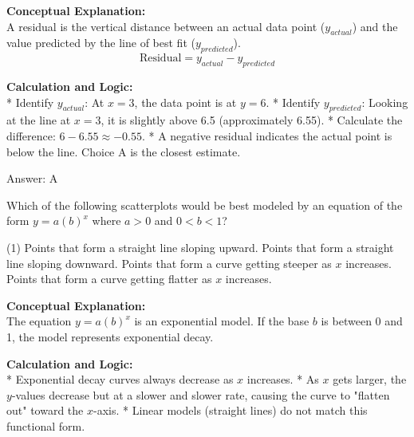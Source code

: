 \documentclass[11pt,paper=a4,answers]{exam}
\begin{document}
\begin{questions}
\begin{solution}
\textbf{Conceptual Explanation:} \\
A residual is the vertical distance between an actual data point ($y_{actual}$) and the value predicted by the line of best fit ($y_{predicted}$). 
\[ \text{Residual} = y_{actual} - y_{predicted} \]

\vspace{30pt}

\textbf{Calculation and Logic:} \\
* Identify $y_{actual}$: At $x = 3$, the data point is at $y = 6$.
* Identify $y_{predicted}$: Looking at the line at $x = 3$, it is slightly above 6.5 (approximately 6.55).
* Calculate the difference: $6 - 6.55 \approx -0.55$.
* A negative residual indicates the actual point is below the line. Choice A is the closest estimate.

\vspace{30pt}

Answer: \colorbox{yellow!100}{A}
\end{solution}

\vspace{60pt}

\question
Which of the following scatterplots would be best modeled by an equation of the form $y = a(b)^x$ where $a > 0$ and $0 < b < 1$?
\begin{tasks}(1)
    \task Points that form a straight line sloping upward.
    \task Points that form a straight line sloping downward.
    \task Points that form a curve getting steeper as $x$ increases.
    \task Points that form a curve getting flatter as $x$ increases.
\end{tasks}

\begin{solution}
\textbf{Conceptual Explanation:} \\
The equation $y = a(b)^x$ is an exponential model. If the base $b$ is between 0 and 1, the model represents exponential decay.

\vspace{30pt}

\textbf{Calculation and Logic:} \\
* Exponential decay curves always decrease as $x$ increases.
* As $x$ gets larger, the $y$-values decrease but at a slower and slower rate, causing the curve to "flatten out" toward the $x$-axis.
* Linear models (straight lines) do not match this functional form.


\end{solution}
\end{questions}
\end{document}
